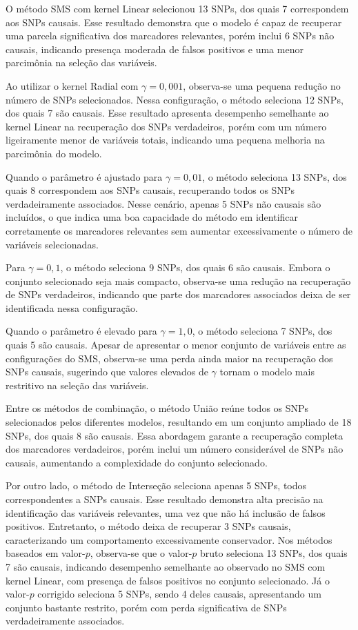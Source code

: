 \documentclass[
    12pt,
    a4paper,
    oneside,
    english,
    french,
    spanish,
    brazil
    ]{abntex2}
\begin{document}
O método SMS com kernel Linear selecionou 13 SNPs, dos quais 7 correspondem aos SNPs causais. Esse resultado demonstra que o modelo é capaz de recuperar uma parcela significativa dos marcadores relevantes, porém inclui 6 SNPs não causais, indicando presença moderada de falsos positivos e uma menor parcimônia na seleção das variáveis.

Ao utilizar o kernel Radial com $\gamma = 0{,}001$, observa-se uma pequena redução no número de SNPs selecionados. Nessa configuração, o método seleciona 12 SNPs, dos quais 7 são causais. Esse resultado apresenta desempenho semelhante ao kernel Linear na recuperação dos SNPs verdadeiros, porém com um número ligeiramente menor de variáveis totais, indicando uma pequena melhoria na parcimônia do modelo.

Quando o parâmetro é ajustado para $\gamma = 0{,}01$, o método seleciona 13 SNPs, dos quais 8 correspondem aos SNPs causais, recuperando todos os SNPs verdadeiramente associados. Nesse cenário, apenas 5 SNPs não causais são incluídos, o que indica uma boa capacidade do método em identificar corretamente os marcadores relevantes sem aumentar excessivamente o número de variáveis selecionadas.

Para $\gamma = 0{,}1$, o método seleciona 9 SNPs, dos quais 6 são causais. Embora o conjunto selecionado seja mais compacto, observa-se uma redução na recuperação de SNPs verdadeiros, indicando que parte dos marcadores associados deixa de ser identificada nessa configuração.

Quando o parâmetro é elevado para $\gamma = 1{,}0$, o método seleciona 7 SNPs, dos quais 5 são causais. Apesar de apresentar o menor conjunto de variáveis entre as configurações do SMS, observa-se uma perda ainda maior na recuperação dos SNPs causais, sugerindo que valores elevados de $\gamma$ tornam o modelo mais restritivo na seleção das variáveis.

Entre os métodos de combinação, o método União reúne todos os SNPs selecionados pelos diferentes modelos, resultando em um conjunto ampliado de 18 SNPs, dos quais 8 são causais. Essa abordagem garante a recuperação completa dos marcadores verdadeiros, porém inclui um número considerável de SNPs não causais, aumentando a complexidade do conjunto selecionado.

Por outro lado, o método de Interseção seleciona apenas 5 SNPs, todos correspondentes a SNPs causais. Esse resultado demonstra alta precisão na identificação das variáveis relevantes, uma vez que não há inclusão de falsos positivos. Entretanto, o método deixa de recuperar 3 SNPs causais, caracterizando um comportamento excessivamente conservador. Nos métodos baseados em valor-$p$, observa-se que o valor-$p$ bruto seleciona 13 SNPs, dos quais 7 são causais, indicando desempenho semelhante ao observado no SMS com kernel Linear, com presença de falsos positivos no conjunto selecionado. Já o valor-$p$ corrigido seleciona 5 SNPs, sendo 4 deles causais, apresentando um conjunto bastante restrito, porém com perda significativa de SNPs verdadeiramente associados.
\end{document}
